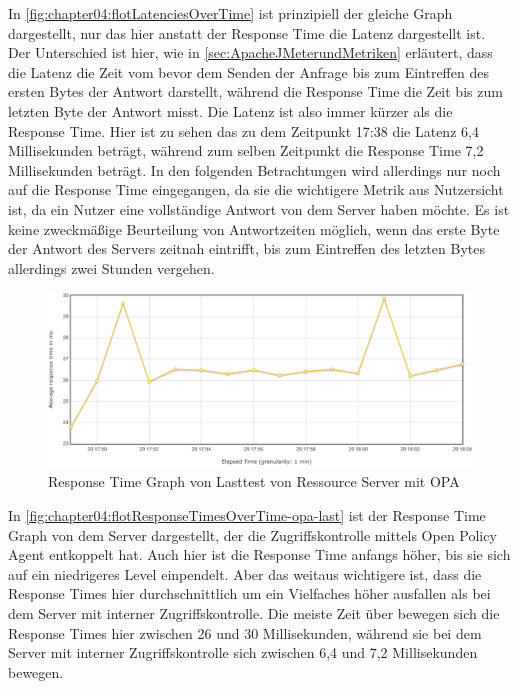 In \autoref{fig:chapter04:flotLatenciesOverTime} ist prinzipiell der gleiche Graph dargestellt, nur das hier anstatt der Response Time die Latenz dargestellt ist. Der Unterschied ist hier, wie in \autoref{sec:ApacheJMeterundMetriken} erläutert, dass die Latenz die Zeit vom bevor dem Senden der Anfrage bis zum Eintreffen des ersten Bytes der Antwort darstellt, während die Response Time die Zeit bis zum letzten Byte der Antwort misst. Die Latenz ist also immer kürzer als die Response Time. Hier ist zu sehen das zu dem Zeitpunkt 17:38 die Latenz 6,4 Millisekunden beträgt, während zum selben Zeitpunkt die Response Time 7,2 Millisekunden beträgt. In den folgenden Betrachtungen wird allerdings nur noch auf die Response Time eingegangen, da sie die wichtigere Metrik aus Nutzersicht ist, da ein Nutzer eine vollständige Antwort von dem Server haben möchte. Es ist keine zweckmäßige Beurteilung von Antwortzeiten möglich, wenn das erste Byte der Antwort des Servers zeitnah eintrifft, bis zum Eintreffen des letzten Bytes allerdings zwei Stunden vergehen. 

\begin{figure}[htbp]
  \centering
  \includegraphics[width=1.0\textwidth]{gfx/flotResponseTimesOverTime-opa-last.png}
  \caption{Response Time Graph von Lasttest von Ressource Server mit OPA}
  \label{fig:chapter04:flotResponseTimesOverTime-opa-last}
\end{figure}

In \autoref{fig:chapter04:flotResponseTimesOverTime-opa-last} ist der Response Time Graph von dem Server dargestellt, der die Zugriffskontrolle mittels Open Policy Agent entkoppelt hat. Auch hier ist die Response Time anfangs höher, bis sie sich auf ein niedrigeres Level einpendelt. Aber das weitaus wichtigere ist, dass die Response Times hier durchschnittlich um ein Vielfaches höher ausfallen als bei dem Server mit interner Zugriffskontrolle. Die meiste Zeit über bewegen sich die Response Times hier zwischen 26 und 30 Millisekunden, während sie bei dem Server mit interner Zugriffskontrolle sich zwischen 6,4 und 7,2 Millisekunden bewegen.\smallskip

